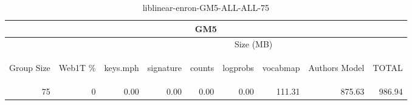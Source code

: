 \begin{center}
\begin{table}[htbp] 
 \begin{center}
\begin{tabular}{ | r | r | r | r | r | r | r | r | r |}
\hline
\multicolumn{9}{|c|}{GM5}\\
\hline
 & & \multicolumn{7}{|c|}{Size (MB)}\\ \cline{3-9}
\begin{sideways}Group Size\end{sideways} & \begin{sideways}Web1T \% \end{sideways} & \begin{sideways}keys.mph\end{sideways} & \begin{sideways}signature\end{sideways} & \begin{sideways}counts\end{sideways} & \begin{sideways}logprobs\end{sideways} & \begin{sideways}vocabmap\end{sideways} & \begin{sideways}Authors Model \end{sideways} & \begin{sideways}TOTAL\end{sideways}\\
\hline
\multirow{0}{*}{75}
 & 0 & 0.00 & 0.00 & 0.00 & 0.00 & 111.31 & 875.63 & 986.94\\ \cline{2-9}
\hline
\end{tabular}
\caption{liblinear-enron-GM5-ALL-ALL-75}
\label{table:liblinear-enron-GM5-ALL-ALL-75}
\end{center}
 \end{table}
\end{center}

